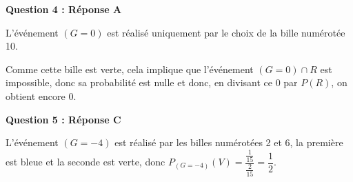	\medskip

	\textbf{Question 4 : Réponse A}

	\smallskip

	L'événement $(G=0)$ est réalisé uniquement par le choix de la bille numérotée 10.

	Comme cette bille est verte, cela implique que l'événement $(G = 0) \cap R$ est impossible, donc sa probabilité est nulle et donc, en divisant ce 0 par $P(R)$, on obtient encore 0.

	\medskip

	\textbf{Question 5 : Réponse C}

	L'événement $(G = - 4)$ est réalisé par les billes numérotées 2 et 6, la première est bleue et la seconde est verte, donc $P_{(G =-4)}(V) = \dfrac{\frac{1}{15}}{\frac{2}{15}} = \dfrac{1}{2}$.
